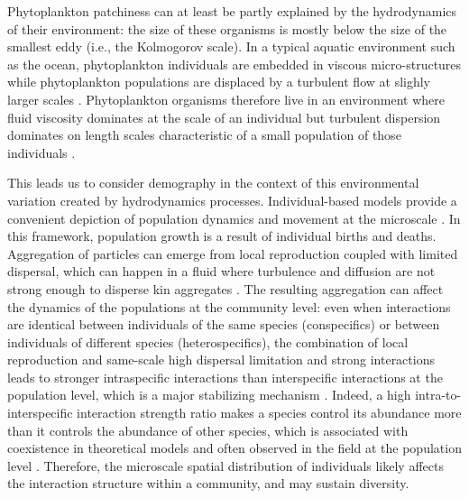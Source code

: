\documentclass[english]{article}
\begin{document}
Phytoplankton patchiness can at least be partly explained by the hydrodynamics
of their environment: the size of these organisms is mostly below
the size of the smallest eddy (i.e., the Kolmogorov scale). In a typical
aquatic environment such as the ocean, phytoplankton individuals are
embedded in viscous micro-structures \citep{peters_effects_2000}
while phytoplankton populations are displaced by a turbulent flow
at slighly larger scales \citep{martin_phytoplankton_2003,prairie_biophysical_2012}.
Phytoplankton organisms therefore live in an environment where fluid
viscosity dominates at the scale of an individual but turbulent dispersion
dominates on length scales characteristic of a small population of
those individuals \citep{estrada_effects_1987,prairie_biophysical_2012}
. 

This leads us to consider demography in the context of this environmental
variation created by hydrodynamics processes. Individual-based models
provide a convenient depiction of population dynamics and movement
at the microscale \citep{hellweger_bunch_2009}. In this framework,
population growth is a result of individual births and deaths. Aggregation
of particles can emerge from local reproduction coupled with limited
dispersal, which can happen in a fluid where turbulence and diffusion
are not strong enough to disperse kin aggregates \citep{young_reproductive_2001}.
The resulting aggregation can affect the dynamics of the populations
at the community level: even when interactions are identical between
individuals of the same species (conspecifics) or between individuals
of different species (heterospecifics), the combination of local reproduction
and same-scale high dispersal limitation and strong interactions leads
to stronger intraspecific interactions than interspecific interactions
at the population level, which is a major stabilizing mechanism \citep{detto_stabilization_2016}.
Indeed, a high intra-to-interspecific interaction strength ratio makes
a species control its abundance more than it controls the abundance
of other species, which is associated with coexistence in theoretical
models \citep{levine_importance_2009,barabas_self-regulation_2017}
and often observed in the field at the population level \citep{adler_competition_2018,picoche_strong_2020}.
Therefore, the microscale spatial distribution of individuals likely
affects the interaction structure within a community, and may sustain
diversity.
\end{document}
